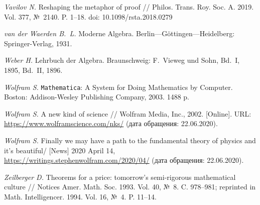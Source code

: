 \documentclass[intlimits,twoside,a4paper,11pt]{article}
\begin{document}
\begin{thebibliography}{99}
{	 {\it Vavilov N.\/} Reshaping the metaphor of proof // Philos. Trans. Roy. Soc. A. 2019.
	Vol. 377, №~2140. P. 1--18. doi: 10.1098/rsta.2018.0279
	
	 {\it van der Waerden B.~L.} Moderne Algebra.  
	Berlin---G\"ottingen---Heidelberg: Springer-Verlag, 1931. %
	
	 {\it Weber H.} Lehrbuch der Algebra. Braunschweig: F.~Vieweg und Sohn, 
	Bd.~I, 1895, Bd.~II, 1896.
	
	
	 {\it Wolfram S.\/} {\tt Mathematica}: A System for Doing Mathematics by Computer. 
	Boston: Addison-Wesley Publishing Company,  2003. 1488 p. 
	
	 {\it Wolfram S.\/} A new kind of science // Wolfram Media, Inc., 2002. [Online]. URL: \url{https://www.wolframscience.com/nks/} (дата обращения: 22.06.2020).
	
	 {\it Wolfram S.\/} Finally we may have a path to the fundamental theory 
	of physics and it’s beautiful/ [News] 2020 April 14, \url{https://writings.stephenwolfram.com/2020/04/} (дата обращения: 22.06.2020).
	
	 {\it Zeilberger D.\/} Theorems for a price: tomorrow's semi-rigorous mathematical 
	culture // Notices Amer. Math. Soc.  1993. Vol. 40, №~8. C. 978--981; reprinted in
	Math. Intelligencer. 1994. Vol. 16, №~4. P. 11--14.}

	
\end{thebibliography}
\end{document}
